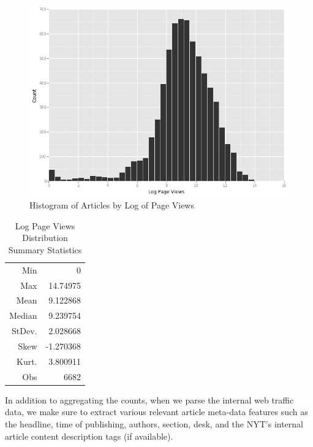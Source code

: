 \documentclass[fleqn,12pt]{SelfArx} %
\begin{document}
\begin{figure}[ht]\centering
\includegraphics[width=\linewidth]{log_pageviews_hist}
\caption{Histogram of Articles by Log of Page Views}
\label{fig:lpv_hist}
\end{figure}

\begin{table}[hbt]
\caption{Log Page Views Distribution Summary Statistics}
\centering
\begin{tabular}{rr}
\toprule
Min               &  0\\
Max               &  14.74975\\  
Mean              &  9.122868\\
Median            &  9.239754\\
StDev.            &  2.028668\\
Skew              &  -1.270368\\
Kurt.             &  3.800911\\
\midrule
Obs &  6682\\
\bottomrule
\end{tabular}
\end{table}


In addition to aggregating the counts, when we parse the internal web traffic data, we make sure to extract various relevant article meta-data features such as the headline, time of publishing, authors, section, desk, and the NYT's internal article content description tags (if available).
\end{document}

